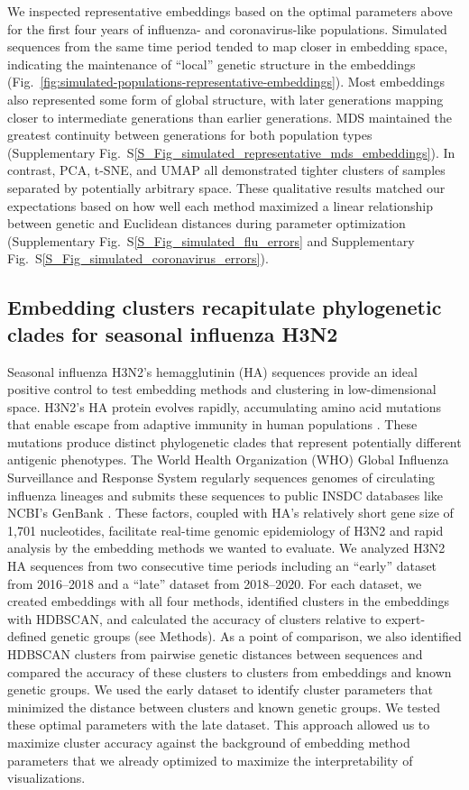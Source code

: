\documentclass[webpdf,contemporary,large,single]{oup-authoring-template}%
\theoremstyle{thmstyleone}%
\theoremstyle{thmstyletwo}%
\theoremstyle{thmstylethree}%
\begin{document}
We inspected representative embeddings based on the optimal parameters above for the first four years of influenza- and coronavirus-like populations.
Simulated sequences from the same time period tended to map closer in embedding space, indicating the maintenance of ``local'' genetic structure in the embeddings (Fig.~\ref{fig:simulated-populations-representative-embeddings}).
Most embeddings also represented some form of global structure, with later generations mapping closer to intermediate generations than earlier generations.
MDS maintained the greatest continuity between generations for both population types (Supplementary Fig.~S\ref{S_Fig_simulated_representative_mds_embeddings}).
In contrast, PCA, t-SNE, and UMAP all demonstrated tighter clusters of samples separated by potentially arbitrary space.
These qualitative results matched our expectations based on how well each method maximized a linear relationship between genetic and Euclidean distances during parameter optimization (Supplementary Fig.~S\ref{S_Fig_simulated_flu_errors} and Supplementary Fig.~S\ref{S_Fig_simulated_coronavirus_errors}).

\subsection{Embedding clusters recapitulate phylogenetic clades for seasonal influenza H3N2}

Seasonal influenza H3N2's hemagglutinin (HA) sequences provide an ideal positive control to test embedding methods and clustering in low-dimensional space.
H3N2's HA protein evolves rapidly, accumulating amino acid mutations that enable escape from adaptive immunity in human populations \citep{Petrova2018}.
These mutations produce distinct phylogenetic clades that represent potentially different antigenic phenotypes.
The World Health Organization (WHO) Global Influenza Surveillance and Response System regularly sequences genomes of circulating influenza lineages \citep{Hay2018} and submits these sequences to public INSDC databases like NCBI's GenBank \citep{Arita2021}.
These factors, coupled with HA's relatively short gene size of 1,701 nucleotides, facilitate real-time genomic epidemiology of H3N2 \citep{Neher2015} and rapid analysis by the embedding methods we wanted to evaluate.
We analyzed H3N2 HA sequences from two consecutive time periods including an ``early'' dataset from 2016--2018 and a ``late'' dataset from 2018--2020.
For each dataset, we created embeddings with all four methods, identified clusters in the embeddings with HDBSCAN, and calculated the accuracy of clusters relative to expert-defined genetic groups (see Methods).
As a point of comparison, we also identified HDBSCAN clusters from pairwise genetic distances between sequences and compared the accuracy of these clusters to clusters from embeddings and known genetic groups.
We used the early dataset to identify cluster parameters that minimized the distance between clusters and known genetic groups.
We tested these optimal parameters with the late dataset.
This approach allowed us to maximize cluster accuracy against the background of embedding method parameters that we already optimized to maximize the interpretability of visualizations.
\end{document}
